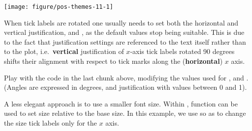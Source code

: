 \documentclass[krantz2]{krantz}\usepackage{knitr}%
\begin{document}
\begin{knitrout}\footnotesize
{}\color{fgcolor}\begin{kframe}
\begin{alltt}
  \hlopt{+}  \hlopt{+}
  \hlstd{()} \hlopt{+}
  \hlstd{(} \hlopt{::}\hlstd{(} \hlstd{=} \hlstd{))} \hlopt{+}
  \hlstd{(} \hlstd{=} \hlstd{(} \hlstd{=} \hlstd{,}  \hlstd{=} \hlstd{,}  \hlstd{=} \hlstd{))}
\end{alltt}
\end{kframe}

{\centering \texttt{[image: figure/pos-themes-11-1]} 

}



\end{knitrout}

\begin{warningbox}
When tick labels are rotated one usually needs to set both the horizontal and vertical justification,  and , as the default values stop being suitable. This is due to the fact that justification settings are referenced to the text itself rather than to the plot, i.e.\ \textbf{vertical} justification of $x$-axis tick labels rotated 90 degrees shifts their alignment with respect to tick marks along the (\textbf{horizontal}) $x$ axis.
\end{warningbox}

\begin{playground}
Play with the code in the last chunk above, modifying the values used for ,  and . (Angles are expressed in degrees, and justification with values between 0 and 1).
\end{playground}

A less elegant approach is to use a smaller font size. Within , function  can be used to set size relative to the base size. In this example, we use  so as to change the size tick labels only for the $x$ axis.

\begin{knitrout}\footnotesize
{}\color{fgcolor}\begin{kframe}
\begin{alltt}
  \hlstd{(} \hlstd{=} \hlstd{(} \hlstd{=} \hlstd{(}\hlstd{)))}
\end{alltt}
\end{kframe}
\end{knitrout}
\end{document}
